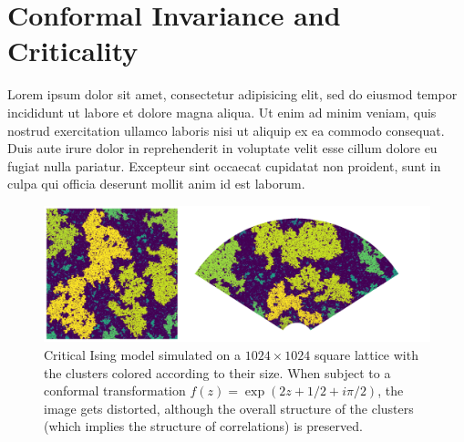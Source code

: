 \section{Conformal Invariance and Criticality}
\label{ch-conf}

Lorem ipsum dolor sit amet, consectetur adipisicing elit, sed do eiusmod tempor
incididunt ut labore et dolore magna aliqua. Ut enim ad minim veniam, quis
nostrud exercitation ullamco laboris nisi ut aliquip ex ea commodo consequat.
Duis aute irure dolor in reprehenderit in voluptate velit esse cillum dolore eu
fugiat nulla pariatur. Excepteur sint occaecat cupidatat non proident, sunt in
culpa qui officia deserunt mollit anim id est laborum.

\begin{figure}
\begin{center}
    \includegraphics[scale=0.5]{chapters/ch3-conf/figs/isingcm}
\end{center}
\caption{Critical Ising model simulated on a $1024\times1024$ square lattice
    with the clusters colored according to their size. When subject to a
    conformal transformation $f(z)=\exp{\left(2z+1/2+i\pi/2\right)}$, the image
    gets distorted, although the overall structure of the clusters (which
    implies the structure of correlations) is preserved.}
\label{fig:isingcm}
\end{figure}


